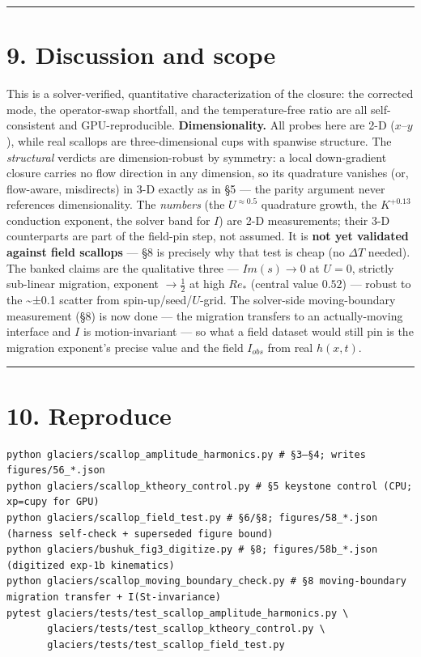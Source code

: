 \documentclass{jfm}
\begin{document}
\medskip\hrule\medskip


\section*{9. Discussion and scope}


This is a solver-verified, quantitative characterization of the closure: the corrected mode, the operator-swap shortfall, and the temperature-free ratio are all self-consistent and GPU-reproducible. \textbf{Dimensionality.} All probes here are 2-D ($x$--$y$), while real scallops are three-dimensional cups with spanwise structure. The \emph{structural} verdicts are dimension-robust by symmetry: a local down-gradient closure carries no flow direction in any dimension, so its quadrature vanishes (or, flow-aware, misdirects) in 3-D exactly as in §5 --- the parity argument never references dimensionality. The \emph{numbers} (the $U^{\approx 0.5}$ quadrature growth, the $K^{+0.13}$ conduction exponent, the solver band for $I$) are 2-D measurements; their 3-D counterparts are part of the field-pin step, not assumed. It is \textbf{not yet validated against field scallops} — §8 is precisely why that test is cheap (no $\Delta T$ needed). The banked claims are the qualitative three — $Im(s)\to 0$ at $U=0$, strictly sub-linear migration, exponent $\to \tfrac{1}{2}$ at high $Re_*$ (central value $0.52$) — robust to the \textasciitilde{}±0.1 scatter from spin-up/seed/$U$-grid. The solver-side moving-boundary measurement (§8) is now done — the migration transfers to an actually-moving interface and $I$ is motion-invariant — so what a field dataset would still pin is the migration exponent's precise value and the field $I_{obs}$ from real $h(x,t)$.


\medskip\hrule\medskip


\section*{10. Reproduce}


\begin{Verbatim}
python glaciers/scallop_amplitude_harmonics.py # §3–§4; writes figures/56_*.json
python glaciers/scallop_ktheory_control.py # §5 keystone control (CPU; xp=cupy for GPU)
python glaciers/scallop_field_test.py # §6/§8; figures/58_*.json (harness self-check + superseded figure bound)
python glaciers/bushuk_fig3_digitize.py # §8; figures/58b_*.json (digitized exp-1b kinematics)
python glaciers/scallop_moving_boundary_check.py # §8 moving-boundary migration transfer + I(St-invariance)
pytest glaciers/tests/test_scallop_amplitude_harmonics.py \
       glaciers/tests/test_scallop_ktheory_control.py \
       glaciers/tests/test_scallop_field_test.py
\end{Verbatim}
\end{document}
